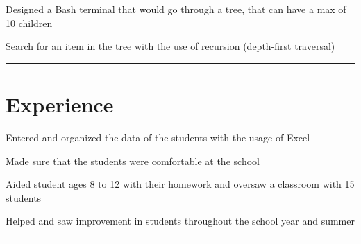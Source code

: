 \documentclass[]{deedy-resume-openfont}
\begin{document}
\begin{tightemize}
\item Designed a Bash terminal that would go through a tree, that can have a max of 10 children
\item Search for an item in the tree with the use of recursion (depth-first traversal)
\end{tightemize}
\noindent\rule{\textwidth}{0.4pt}
\section{Experience}

\begin{tightemize}
\item Entered and organized the data of the students with the usage of Excel
\item Made sure that the students were comfortable at the school
\end{tightemize}
\sectionsep


\begin{tightemize}
\item Aided student ages 8 to 12 with their homework and oversaw a classroom with 15 students
\item Helped and saw improvement in students throughout the school year and summer
\end{tightemize}
\noindent\rule{\textwidth}{0.4pt}
\end{document}
